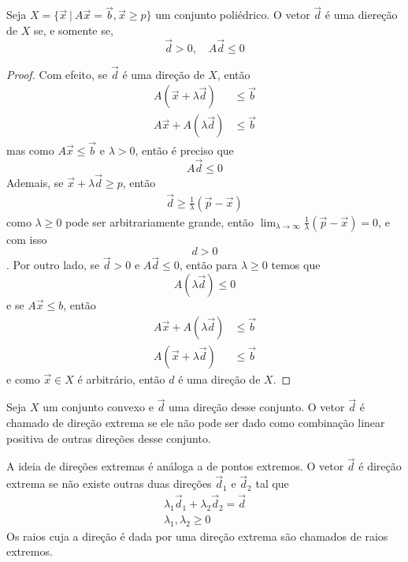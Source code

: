 \begin{prop:direção}
	Seja $X = \{\vec{x}\ |\ A\vec{x} = \vec{b}, \vec{x} \geq p\}$ um conjunto poliédrico.
	O vetor $\vec{d}$ é uma diereção de $X$ se, e somente se,
	\begin{equation*}
		\vec{d} > 0, \quad A\vec{d} \leq 0
	\end{equation*}

	\begin{proof}
		Com efeito, se $\vec{d}$ é uma direção de $X$, então
		\begin{align*}
			A (\vec{x} + \lambda \vec{d}) &\leq \vec{b} \\
			A \vec{x} + A (\lambda \vec{d}) & \leq \vec b
		\end{align*}
		mas como $A \vec{x} \leq \vec{b}$ e $\lambda > 0$, então é preciso que
		\begin{equation*}
			A\vec{d} \leq 0
		\end{equation*}
		Ademais, se $\vec{x} + \lambda \vec{d} \geq p$, então
		\begin{align}
			\vec{d} \geq \frac{1}{\lambda} (\vec p - \vec{x})
		\end{align}
		como $\lambda \geq 0$ pode ser arbitrariamente grande, então
		$\lim_{\lambda \to \infty} \frac{1}{\lambda}(\vec p -\vec{x}) = 0$, e com isso
		\[d > 0\].
		Por outro lado, se $\vec{d} > 0$ e $A \vec{d} \leq 0$, então para $\lambda \geq 0$ temos que
		\[A (\lambda \vec{d}) \leq 0\]
		e se $A \vec{x} \leq b$, então
		\begin{align*}
			A \vec{x} + A (\lambda \vec{d}) &\leq \vec{b} \\
			A (\vec{x} + \lambda \vec{d}) &\leq \vec{b}
		\end{align*}
		e como $\vec{x} \in X$ é arbitrário, então $d$ é uma direção de $X$.
	\end{proof}
\end{prop:direção}

\begin{def:direção extrema}
	Seja $X$ um conjunto convexo e $\vec{d}$ uma direção desse conjunto. O vetor
	$\vec{d}$ é chamado de direção extrema se ele não pode ser dado como combinação
	linear positiva de outras direções desse conjunto.
\end{def:direção extrema}

A ideia de direções extremas é análoga a de pontos extremos. O vetor $\vec{d}$ é
direção extrema se não existe outras duas direções $\vec{d}_1$ e $\vec{d}_2$
tal que
\begin{gather*}
	\lambda_1\vec{d}_1 + \lambda_2\vec{d}_2 = \vec{d} \\
	\lambda_1, \lambda_2 \geq 0
\end{gather*}
Os raios cuja a direção é dada por uma direção extrema são chamados de raios
extremos.

